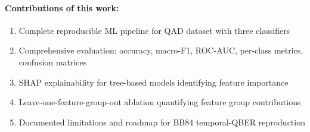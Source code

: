 \paragraph{Contributions of this work:}
\begin{enumerate}
    \item Complete reproducible ML pipeline for QAD dataset with three classifiers
    \item Comprehensive evaluation: accuracy, macro-F1, ROC-AUC, per-class metrics, confusion matrices
    \item SHAP explainability for tree-based models identifying feature importance
    \item Leave-one-feature-group-out ablation quantifying feature group contributions
    \item Documented limitations and roadmap for BB84 temporal-QBER reproduction
\end{enumerate}